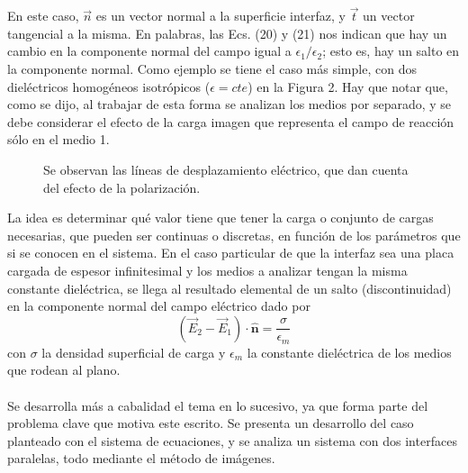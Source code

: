 \documentclass[12pt, notitlepage]{article}
\numberwithin{equation}{section}
\begin{document}
En este caso, $\vec{n}$ es un vector normal a la superficie interfaz, y $\vec{t}$ un vector tangencial a la misma. En palabras, las Ecs. (20) y (21) nos indican que hay un cambio en la componente normal del campo igual a $\epsilon_1/\epsilon_2$; esto es, hay un salto en la componente normal. Como ejemplo se tiene el caso más simple, con dos dieléctricos homogéneos isotrópicos ($\epsilon = cte$) en la Figura 2. Hay que notar que, como se dijo, al trabajar de esta forma se analizan los medios por separado, y se debe considerar el efecto de la carga imagen que representa el campo de reacción sólo en el medio 1.
\begin{figure}[H]
\vspace{2cm}
\centering

\caption{Se observan las líneas de desplazamiento eléctrico, que dan cuenta del efecto de la polarización.}
\end{figure}
\noindent
La idea es determinar qué valor tiene que tener la carga o conjunto de cargas necesarias, que pueden ser continuas o discretas, en función de los parámetros que si se conocen en el sistema. En el caso particular de que la interfaz sea una placa cargada de espesor infinitesimal y los medios a analizar tengan la misma constante dieléctrica, se llega al resultado elemental de un salto (discontinuidad) en la componente normal del campo eléctrico dado por
\begin{equation}
(\vec{E}_2 - \vec{E}_1)\cdot\hat{\mathbf{n}} = \frac{\sigma}{\epsilon_m}
\end{equation}
con $\sigma$ la densidad superficial de carga y $\epsilon_m$ la constante dieléctrica de los medios que rodean al plano. \\\\
Se desarrolla más a cabalidad el tema en lo sucesivo, ya que forma parte del problema clave que motiva este escrito. Se presenta un desarrollo del caso planteado con el sistema de ecuaciones, y se analiza un sistema con dos interfaces paralelas, todo mediante el método de imágenes. 
\end{document}

